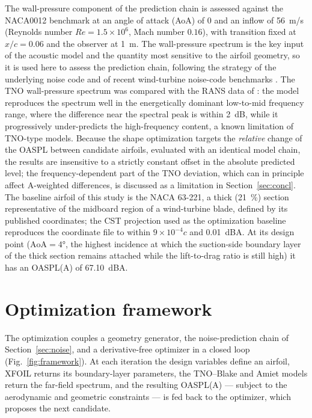 \documentclass[preprint,3p,times]{elsarticle}
\begin{document}
The wall-pressure component of the prediction chain is assessed against the
NACA0012 benchmark at an angle of attack (AoA) of $0$ and an inflow of
\SI{56}{m/s} (Reynolds number $Re=1.5\times10^6$, Mach number $0.16$), with
transition fixed at $x/c=0.06$ and the observer at \SI{1}{m}. The wall-pressure
spectrum is the key input of the acoustic model and the quantity most sensitive
to the airfoil geometry, so it is used here to assess the prediction chain,
following the strategy of the underlying noise code and of recent wind-turbine
noise-code benchmarks \citep{NRELbenchmark2023}.
The TNO wall-pressure spectrum was compared with the RANS
data of \citet{Kucukosman2018}: the model reproduces the spectrum well in the
energetically dominant low-to-mid frequency range, where the difference near the
spectral peak is within \SI{2}{dB}, while it progressively under-predicts the
high-frequency content, a known limitation of TNO-type models. Because the
shape optimization targets the \emph{relative} change of the OASPL between
candidate airfoils, evaluated with an identical model chain, the results are
insensitive to a strictly constant offset in the absolute predicted level;
the frequency-dependent part of the TNO deviation, which can in principle
affect A-weighted differences, is discussed as a limitation in
Section~\ref{sec:concl}. The baseline
airfoil of this study is the NACA 63-221, a thick (\SI{21}{\percent}) section
representative of the midboard region of a wind-turbine blade, defined by its
published coordinates; the CST projection used as the optimization baseline
reproduces the coordinate file to within $9\times10^{-4}c$ and \SI{0.01}{dBA}.
At its design point ($\mathrm{AoA}=\ang{4}$, the highest incidence at which the
suction-side boundary layer of the thick section remains attached while the
lift-to-drag ratio is still high) it has an OASPL(A) of \SI{67.10}{dBA}.

\section{Optimization framework}\label{sec:opt}
The optimization couples a geometry generator, the noise-prediction chain of
Section~\ref{sec:noise}, and a derivative-free optimizer in a closed loop
(Fig.~\ref{fig:framework}). At each iteration the design variables define an
airfoil, XFOIL returns its boundary-layer parameters, the TNO--Blake and Amiet
models return the far-field spectrum, and the resulting OASPL(A) --- subject to
the aerodynamic and geometric constraints --- is fed back to the optimizer,
which proposes the next candidate.
\end{document}
